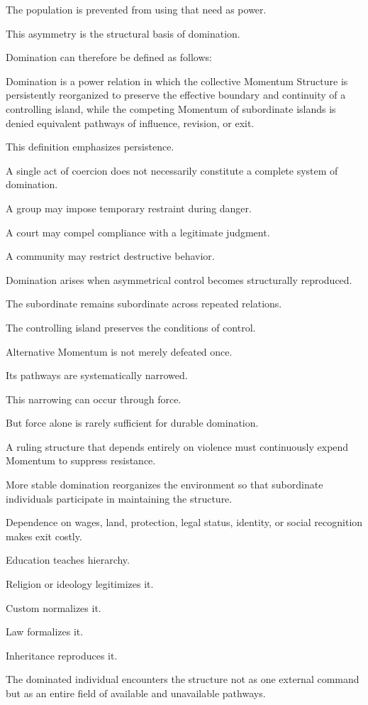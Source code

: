 The population is prevented from using that need as power.

This asymmetry is the structural basis of domination.

Domination can therefore be defined as follows:

Domination is a power relation in which the collective Momentum Structure is persistently reorganized to preserve the effective boundary and continuity of a controlling island, while the competing Momentum of subordinate islands is denied equivalent pathways of influence, revision, or exit.

This definition emphasizes persistence.

A single act of coercion does not necessarily constitute a complete system of domination.

A group may impose temporary restraint during danger.

A court may compel compliance with a legitimate judgment.

A community may restrict destructive behavior.

Domination arises when asymmetrical control becomes structurally reproduced.

The subordinate remains subordinate across repeated relations.

The controlling island preserves the conditions of control.

Alternative Momentum is not merely defeated once.

Its pathways are systematically narrowed.

This narrowing can occur through force.

But force alone is rarely sufficient for durable domination.

A ruling structure that depends entirely on violence must continuously expend Momentum to suppress resistance.

More stable domination reorganizes the environment so that subordinate individuals participate in maintaining the structure.

Dependence on wages, land, protection, legal status, identity, or social recognition makes exit costly.

Education teaches hierarchy.

Religion or ideology legitimizes it.

Custom normalizes it.

Law formalizes it.

Inheritance reproduces it.

The dominated individual encounters the structure not as one external command but as an entire field of available and unavailable pathways.

